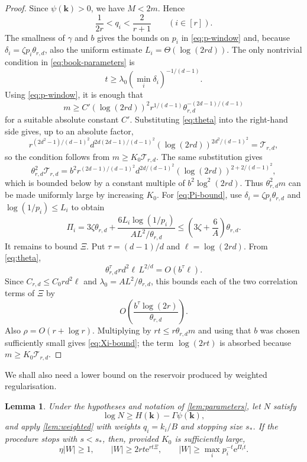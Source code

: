 \documentclass[11pt]{article}
\newtheorem{lemma}[theorem]{Lemma}
\theoremstyle{definition}
\newcommand{\e}{\mathrm e}
\newcommand{\kk}{\mathbf k}
\newcommand{\Ent}{H}
\newcommand{\pot}{\psi}
\begin{document}
\begin{proof}
Since $\pot(\kk)>0$, we have $M<2m$.  Hence
\begin{equation}\label{eq:q-window}
 \frac1{2r}<q_i<\frac2{r+1}
 \qquad(i\in[r]).
\end{equation}
The smallness of $\gamma$ and $b$ gives the bounds on $p_i$ in
\eqref{eq:p-window} and, because $\delta_i=\zeta p_i\theta_{r,d}$, also the
uniform estimate $L_i=\Theta(\log(2rd))$.
The only nontrivial condition in \eqref{eq:book-parameters} is
\[
 t\ge\lambda_0(\min_i\delta_i)^{-1/(d-1)}.
\]
Using \eqref{eq:p-window}, it is enough that
\[
 m\ge C'
 (\log(2rd))^2r^{1/(d-1)}
 \theta_{r,d}^{-(2d-1)/(d-1)}
\]
for a suitable absolute constant $C'$.
Substituting \eqref{eq:theta} into the right-hand side gives, up to an absolute
factor,
\[
 r^{(2d^2-1)/(d-1)^2}
 d^{2d(2d-1)/(d-1)^2}
 (\log(2rd))^{2d^2/(d-1)^2}
 =\mathcal T_{r,d},
\]
so the condition follows from $m\ge K_0\mathcal T_{r,d}$.
The same substitution gives
\[
 \theta_{r,d}^2\mathcal T_{r,d}
 =b^2 r^{(2d-1)/(d-1)^2}
 d^{2d/(d-1)^2}
 (\log(2rd))^{2+2/(d-1)^2},
\]
which is bounded below by a constant multiple of $b^2\log^2(2rd)$.
Thus $\theta_{r,d}^2m$ can be made uniformly large by increasing $K_0$.
For \eqref{eq:Pi-bound}, use $\delta_i=\zeta p_i\theta_{r,d}$ and
$\log(1/p_i)\le L_i$ to obtain
\[
 \Pi_i
 =3\zeta\theta_{r,d}
 +\frac{6L_i\log(1/p_i)}{AL^2/\theta_{r,d}}
 \le\left(3\zeta+\frac6A\right)\theta_{r,d}.
\]
It remains to bound $\Xi$.  Put $\tau=(d-1)/d$ and
$\ell=\log(2rd)$.  From \eqref{eq:theta},
\[
 \theta_{r,d}^{\tau}rd^2\ell\,L^{2/d}
 =O(b^\tau\ell).
\]
Since $C_{r,d}\le C_0rd^2\ell$ and $\lambda_0=AL^2/\theta_{r,d}$, this bounds
each of the two correlation terms of $\Xi$ by
\[
 O\!\left(\frac{b^\tau\log(2r)}{\theta_{r,d}}\right).
\]
Also $\rho=O(r+\log r)$.  Multiplying by
$rt\le r\theta_{r,d}m$ and using that $b$ was chosen sufficiently small gives
\eqref{eq:Xi-bound}; the term $\log(2rt)$ is absorbed because
$m\ge K_0\mathcal T_{r,d}$.
\end{proof}

We shall also need a lower bound on the reservoir produced by weighted
regularisation.

\begin{lemma}\label{lem:reservoir}
Under the hypotheses and notation of \cref{lem:parameters}, let $N$ satisfy
\[
 \log N\ge \Ent(\kk)-\Gamma\pot(\kk),
\]
and apply \cref{lem:weighted} with weights $q_i=k_i/B$ and stopping size
$s_\ast$.  If the procedure stops with $s<s_\ast$, then, provided $K_0$ is
sufficiently large,
\begin{equation}\label{eq:reservoir-conclusion}
 \eta|W|\ge1,
 \qquad
 |W|\ge2rt\e^{rt\Xi},
 \qquad
 |W|\ge\max_i p_i^{-t}\e^{\Pi_it}.
\end{equation}
\end{lemma}
\end{document}
